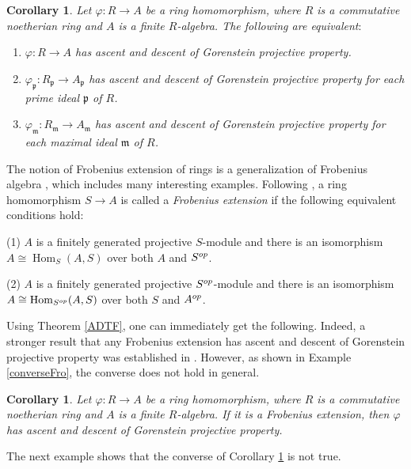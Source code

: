 \documentclass{amsart}
\newcommand{\0}{{\bf{0}}}
\newcommand{\m}{\mathfrak{m}}
\newcommand{\p}{\mathfrak{p}}
\DeclareMathOperator{\Hom}{Hom}
\newtheorem{corollary}[theorem]{Corollary}
\theoremstyle{definition}
\begin{document}
\begin{corollary}\label{local property}
Let $\varphi\colon R\rightarrow A$ be a ring homomorphism, where $R$ is a commutative noetherian ring and $A$ is a finite $R$-algebra. The following are equivalent$\colon$
\begin{enumerate}
    \item\label{ad} $\varphi\colon R\rightarrow A$ has ascent and descent of Gorenstein projective property.

    \item\label{adp} $\varphi_\p\colon R_\p\rightarrow A_\p$ has ascent and descent of Gorenstein projective property for each prime ideal $\p$ of $R$.

      \item\label{adm} $\varphi_\m\colon R_\m\rightarrow A_\m$ has ascent and descent of Gorenstein projective property for each maximal ideal $\m$ of $R$.
\end{enumerate}
\end{corollary}

The notion of Frobenius extension of rings is a generalization of Frobenius algebra \cite{Kas}, which includes many interesting examples. Following \cite[Theorem 1.2]{Kad},  a ring homomorphism $S\rightarrow A$ is called a \emph{Frobenius extension} if the following equivalent conditions hold:

(1) $A$ is a finitely generated projective  $S$-module and there is an isomorphism $A\cong \Hom_{S}(A,S)$ over both $A$ and $S^{\rm op}$.

(2) $A$ is a finitely generated projective $S^{\rm op}$-module and there is an isomorphism $A\cong \Hom_{S^{\rm op}}(A,S)$ over both $S$ and $A^{\rm op}$.


Using Theorem \ref{ADTF}, one can immediately get the following. Indeed, a stronger result that any Frobenius extension has ascent and descent of Gorenstein projective property was established in \cite{Chen, Ren, Zhao}. However, as shown in Example \ref{converseFro}, the converse does not hold in general.

\begin{corollary}\label{motivation}
Let $\varphi\colon R\rightarrow A$ be a ring homomorphism, where $R$ is a commutative noetherian ring and $A$ is a finite $R$-algebra. If it is a Frobenius extension, then $\varphi$ has ascent and descent of Gorenstein projective property.
\end{corollary}

The next example shows that the converse of Corollary \ref{motivation} is not true.
\end{document}
